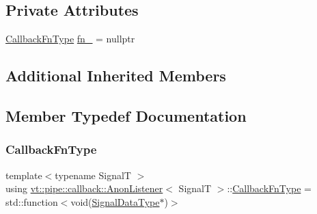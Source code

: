 \subsection*{Private Attributes}
\begin{DoxyCompactItemize}
\item 
\hyperlink{structvt_1_1pipe_1_1callback_1_1_anon_listener_ad5d8a2cc6a1599642855e92bbd10f89c}{Callback\+Fn\+Type} \hyperlink{structvt_1_1pipe_1_1callback_1_1_anon_listener_a6f708087804e0304e627db3f446bb449}{fn\+\_\+} = nullptr
\end{DoxyCompactItemize}
\subsection*{Additional Inherited Members}


\subsection{Member Typedef Documentation}
\mbox{\label{structvt_1_1pipe_1_1callback_1_1_anon_listener_ad5d8a2cc6a1599642855e92bbd10f89c}} 
\subsubsection{\texorpdfstring{Callback\+Fn\+Type}{CallbackFnType}}
{\footnotesize\ttfamily template$<$typename SignalT $>$ \\
using \hyperlink{structvt_1_1pipe_1_1callback_1_1_anon_listener}{vt\+::pipe\+::callback\+::\+Anon\+Listener}$<$ SignalT $>$\+::\hyperlink{structvt_1_1pipe_1_1callback_1_1_anon_listener_ad5d8a2cc6a1599642855e92bbd10f89c}{Callback\+Fn\+Type} =  std\+::function$<$void(\hyperlink{structvt_1_1pipe_1_1callback_1_1_anon_listener_a26182294e0b15bb16dd94040bb47ed73}{Signal\+Data\+Type}$\ast$)$>$}

\mbox{\label{structvt_1_1pipe_1_1callback_1_1_anon_listener_a26182294e0b15bb16dd94040bb47ed73}} 
